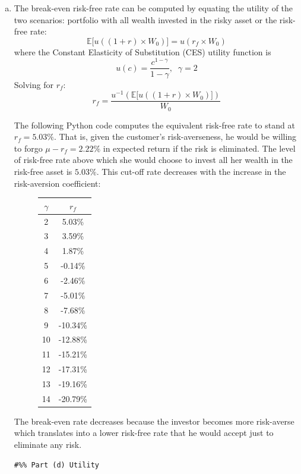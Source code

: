 \documentclass[10pt]{article}
\newcommand{\Ebb}{\mathbb{E}}
\newenvironment{exercise}[2][Exercise]{\begin{trivlist}
  \item[\hskip \labelsep {\bfseries #1}\hskip \labelsep {\bfseries #2.}]}{\end{trivlist}}
\begin{document}
\begin{exercise}{2}
\begin{enumerate}[(a)]
   \item
     The break-even risk-free rate can be computed by equating the utility of
     the two scenarios: portfolio with all wealth invested in the risky asset
     or the risk-free rate:
     \begin{equation*}
       \Ebb \big[ u\left((1 + r) \times W_0\right) \big] = u(r_f \times W_0)
     \end{equation*}
     where the Constant Elasticity of Substitution (CES) utility function is
     \begin{equation*}
       u(c) = \frac{c^{1 - \gamma}}{1 - \gamma}, \;\; \gamma = 2
     \end{equation*}
     Solving for $r_f$:
     \begin{equation*}
       r_f = \frac{u^{-1}\left( \Ebb\big[ u\left( (1+r) \times W_0 \right) \big] \right)}{W_0}
     \end{equation*}

     The following Python code computes the equivalent risk-free rate to stand
     at $r_f = 5.03\%$. That is, given the customer's risk-averseness, he would
     be willing to forgo $\mu - r_f = 2.22\%$ in expected return if the risk
     is eliminated. The level of risk-free rate above which she would choose to
     invest all her wealth in the risk-free asset is $5.03 \%$. This cut-off
     rate decreases with the increase in the risk-aversion coefficient:
     \begin{figure}[H]
       \centering
          \begin{tabular}{||c|c||}
          \toprule
          $\gamma$ &        $r_f$ \\
          \midrule
          2  &       5.03\% \\ \hline
          3  &       3.59\% \\ \hline
          4  &       1.87\% \\ \hline
          5  &      -0.14\% \\ \hline
          6  &      -2.46\% \\ \hline
          7  &      -5.01\% \\ \hline
          8  &      -7.68\% \\ \hline
          9  &     -10.34\% \\ \hline
          10 &     -12.88\% \\ \hline
          11 &     -15.21\% \\ \hline
          12 &     -17.31\% \\ \hline
          13 &     -19.16\% \\ \hline
          14 &     -20.79\% \\ \hline
          \bottomrule
          \end{tabular}
      \end{figure}
      The break-even rate decreases because the investor becomes more
      risk-averse which translates into a lower risk-free rate that he would
      accept just to eliminate any risk.
    \begin{lstlisting}
#%% Part (d) Utility


\end{lstlisting}
\end{enumerate}
\end{exercise}
\end{document}
